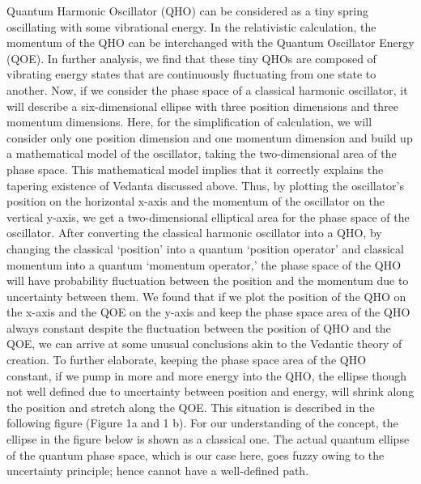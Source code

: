 \documentclass[twoside, 13pt]{article}
\begin{document}
{{\fontsize{12}{14}\selectfont Quantum Harmonic Oscillator (QHO) can be considered as a tiny spring oscillating with some vibrational energy. In the relativistic calculation, the momentum of the QHO can be interchanged with the Quantum Oscillator Energy (QOE). In further analysis, we find that these tiny QHOs are composed of vibrating energy states that are continuously fluctuating from one state to another. Now, if we consider the phase space of a classical harmonic oscillator, it will describe a six-dimensional ellipse with three position dimensions and three momentum dimensions. Here, for the simplification of calculation, we will consider only one position dimension and one momentum dimension and build up a mathematical model of the oscillator, taking the two-dimensional area of the phase space. This mathematical model implies that it correctly explains the tapering existence of Vedanta discussed above. Thus, by plotting the oscillator's position on the horizontal x-axis and the momentum of the oscillator on the vertical y-axis, we get a two-dimensional elliptical area for the phase space of the oscillator. After converting the classical harmonic oscillator into a QHO, by changing the classical ‘position’ into a quantum ‘position operator’ and classical momentum into a quantum ‘momentum operator,’ the phase space of the QHO will have probability fluctuation between the position and the momentum due to uncertainty between them. We found that if we plot the position of the QHO on the x-axis and the QOE on the y-axis and keep the phase space area of the QHO always constant despite the fluctuation between the position of QHO and the QOE, we can arrive at some unusual conclusions akin to the Vedantic theory of creation. To further elaborate, keeping the phase space area of the QHO constant, if we pump in more and more energy into the QHO, the ellipse though not well defined due to uncertainty between position and energy, will shrink along the position and stretch along the QOE. This situation is described in the following figure (Figure 1a and 1 b). For our understanding of the concept, the ellipse in the figure below is shown as a classical one. The actual quantum ellipse of the quantum phase space, which is our case here, goes fuzzy owing to the uncertainty principle; hence cannot have a well-defined path.}


}
\end{document}
